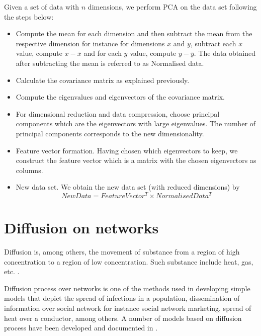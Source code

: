 \documentclass[10pt,a4paper]{article}
\begin{document}
       Given a set of data with $n$ dimensions, we perform PCA on the data set following the steps below:
       \begin{itemize}
       	\item Compute the mean for each dimension and then subtract the mean from the respective dimension for instance for dimensions $x$ and $y$, subtract each $x$ value, compute $x-\bar{x}$ and for each $y$ value, compute $y-\bar{y}$. The data obtained after subtracting the mean is referred to as Normalised data.
       	\item Calculate the covariance matrix as explained previously.
       	\item Compute the eigenvalues and eigenvectors of the covariance matrix.
       	\item For dimensional reduction and data compression, choose principal components which are the eigenvectors with large eigenvalues. The number of principal components corresponds to the new dimensionality.
       	\item Feature vector formation. Having chosen which eigenvectors to keep, we construct the feature vector which is a matrix with the chosen eigenvectors as columns.
       	\item New data set. We obtain the new data set (with reduced dimensions) by 
       	 \begin{equation}
       	 NewData = FeatureVector^T \times NormalisedData^T
       	 \end{equation}
       	
       \end{itemize}
    
    \section{Diffusion on networks}
    Diffusion is, among others, the movement of substance from a region of high concentration to a region of low concentration. Such substance include heat, gas, etc. \citep{newman2010networks}.
    
    Diffusion process over networks is one of the methods used in developing simple models that depict the spread of infections in a population, dissemination of information over social network for instance social network marketing, spread of heat over a conductor, among others. A number of models based on diffusion process have been developed and documented in \citep{estrada2011epidemic,kasprzak2012diffusion,lopez2008diffusion}.
    
\end{document}
